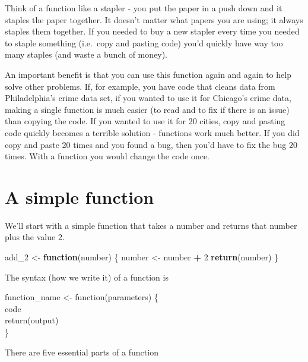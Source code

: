 \documentclass[
  12pt,
]{book}
\newenvironment{Shaded}{\begin{snugshade}}{\end{snugshade}}
\newcommand{\ControlFlowTok}[1]{\textcolor[rgb]{0.27,0.27,0.27}{\textbf{#1}}}
\newcommand{\DecValTok}[1]{\textcolor[rgb]{0.06,0.06,0.06}{#1}}
\newcommand{\KeywordTok}[1]{\textcolor[rgb]{0.27,0.27,0.27}{\textbf{#1}}}
\newcommand{\NormalTok}[1]{#1}
\newcommand{\OperatorTok}[1]{\textcolor[rgb]{0.43,0.43,0.43}{\textbf{#1}}}
\newcommand{\StringTok}[1]{\textcolor[rgb]{0.5,0.5,0.5}{#1}}
\begin{document}
Think of a function like a stapler - you put the paper in a push down and it staples the paper together. It doesn't matter what papers you are using; it always staples them together. If you needed to buy a new stapler every time you needed to staple something (i.e.~copy and pasting code) you'd quickly have way too many staples (and waste a bunch of money).

An important benefit is that you can use this function again and again to help solve other problems. If, for example, you have code that cleans data from Philadelphia's crime data set, if you wanted to use it for Chicago's crime data, making a single function is much easier (to read and to fix if there is an issue) than copying the code. If you wanted to use it for 20 cities, copy and pasting code quickly becomes a terrible solution - functions work much better. If you did copy and paste 20 times and you found a bug, then you'd have to fix the bug 20 times. With a function you would change the code once.

\hypertarget{a-simple-function}{%
\section{A simple function}\label{a-simple-function}}

We'll start with a simple function that takes a number and returns that number plus the value 2.

\begin{Shaded}
\begin{Highlighting}[]
\NormalTok{add\_}\DecValTok{2}\NormalTok{ <{-}}\StringTok{ }\ControlFlowTok{function}\NormalTok{(number) \{}
\NormalTok{  number <{-}}\StringTok{ }\NormalTok{number }\OperatorTok{+}\StringTok{ }\DecValTok{2}
  \KeywordTok{return}\NormalTok{(number)}
\NormalTok{\}}
\end{Highlighting}
\end{Shaded}

The syntax (how we write it) of a function is

function\_name \textless- function(parameters)
\{\\
code\\
return(output)\\
\}

There are five essential parts of a function
\end{document}
